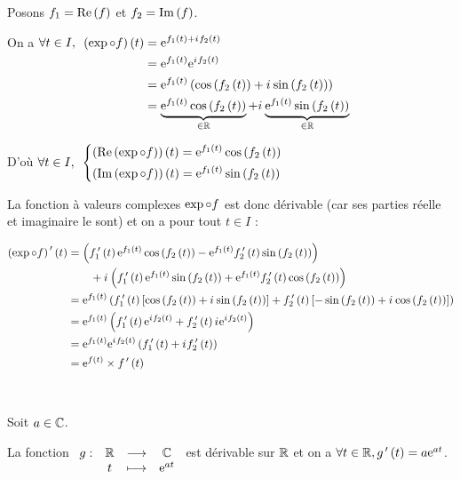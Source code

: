 \begin{dem}
Posons \(f_1=\operatorname{Re}\left(f\right)\) et \(f_2=\operatorname{Im}\left(f\right)\).

On a \(\begin{aligned}[t]
\quantifs{\forall t\in I}\paren{\exp\rond f}\paren{t}&=\e{f_1\paren{t}+\i f_2\paren{t}} \\
&=\e{f_1\paren{t}}\e{\i f_2\paren{t}} \\
&=\e{f_1\paren{t}}\paren{\cos\paren{f_2\paren{t}}+\i\sin\paren{f_2\paren{t}}} \\
&=\underbrace{\e{f_1\paren{t}}\cos\paren{f_2\paren{t}}}_{\in\R}+\i\underbrace{\e{f_1\paren{t}}\sin\paren{f_2\paren{t}}}_{\in\R}
\end{aligned}\)

D'où \(\quantifs{\forall t\in I}\begin{dcases}\paren{\Re\paren{\exp\rond f}}\paren{t}=\e{f_1\paren{t}}\cos\paren{f_2\paren{t}} \\ \paren{\Im\paren{\exp\rond f}}\paren{t}=\e{f_1\paren{t}}\sin\paren{f_2\paren{t}}\end{dcases}\)

La fonction à valeurs complexes \(\exp\circ f\) est donc dérivable (car ses parties réelle et imaginaire le sont) et on a pour tout \(t\in I\) :

\begin{align*}
\left(\exp\circ f\right)^{\,\prime}\left(t\right)&=\left(f_1^{\,\prime}\left(t\right)\mathrm{e}^{f_1\left(t\right)}\cos\left(f_2\left(t\right)\right)-\mathrm{e}^{f_1\left(t\right)}f_2^{\,\prime}\left(t\right)\sin\left(f_2\left(t\right)\right)\right)\notag\\
&\qquad+i\mkern1mu\left(f_1^{\,\prime}\left(t\right)\mathrm{e}^{f_1\left(t\right)}\sin\left(f_2\left(t\right)\right)+\mathrm{e}^{f_1\left(t\right)}f_2^{\,\prime}\left(t\right)\cos\left(f_2\left(t\right)\right)\right) \\
&=\mathrm{e}^{f_1\left(t\right)}\left(f_1^{\,\prime}\left(t\right)\left[\cos\left(f_2\left(t\right)\right)+i\mkern1mu\sin\left(f_2\left(t\right)\right)\right]+f_2^{\,\prime}\left(t\right)\left[-\sin\left(f_2\left(t\right)\right)+i\mkern1mu\cos\left(f_2\left(t\right)\right)\right]\right) \\
&=\mathrm{e}^{f_1\left(t\right)}\left(f_1^{\,\prime}\left(t\right)\mathrm{e}^{i\mkern1mu f_2\left(t\right)}+f_2^{\,\prime}\left(t\right)i\mkern1mu\mathrm{e}^{i\mkern1mu f_2\left(t\right)}\right) \\
&=\mathrm{e}^{f_1\left(t\right)}\mathrm{e}^{i\mkern1mu f_2\left(t\right)}\left(f_1^{\,\prime}\left(t\right)+i\mkern1mu f_2^{\,\prime}\left(t\right)\right) \\
&=\mathrm{e}^{f\left(t\right)}\times f^{\,\prime}\left(t\right)
\end{align*}

~
\end{dem}

\begin{ex}
Soit \(a\in\mathbb{C}\).

La fonction \(\begin{array}[t]{cccc}g : & \mathbb{R} & \longrightarrow & \mathbb{C} \\ & t & \longmapsto & \mathrm{e}^{at}\end{array}\) est dérivable sur \(\mathbb{R}\) et on a \(\forall t\in\mathbb{R},g^{\,\prime}\left(t\right)=a\mathrm{e}^{at}\).
\end{ex}

